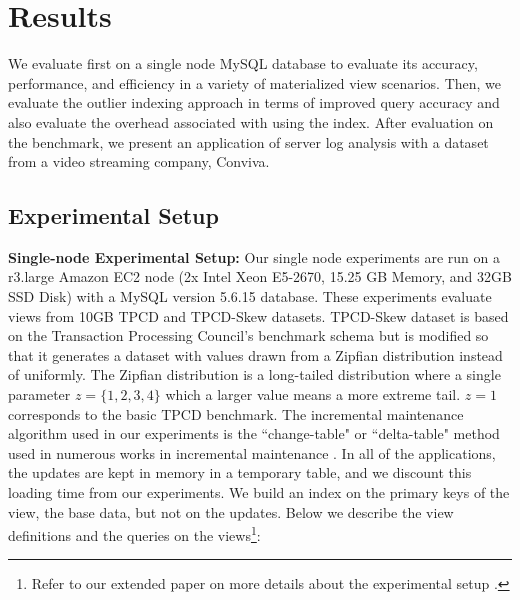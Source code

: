 \section{Results}
\label{exp}
We evaluate \svc first on a single node MySQL database to evaluate its accuracy, performance, and efficiency in a variety of materialized view 
scenarios.
Then, we evaluate the outlier indexing approach in terms of improved query accuracy and also evaluate the overhead associated with using the index.
After evaluation on the benchmark, we present an application of server log analysis with a dataset from a video streaming company, Conviva.

\subsection{Experimental Setup} %
\noindent\textbf{Single-node Experimental Setup: }
Our single node experiments are run on a r3.large Amazon EC2 node (2x Intel Xeon E5-2670, 15.25 GB Memory, and 32GB SSD Disk) with a MySQL version 5.6.15 database.
These experiments evaluate views from 10GB TPCD and TPCD-Skew datasets.
TPCD-Skew dataset \cite{tpcdskew} is based on the Transaction Processing Council's benchmark
schema but is modified so that it generates a dataset with values drawn from a Zipfian distribution instead of uniformly.
The Zipfian distribution \cite{mitzenmacher2004brief} is a long-tailed distribution where a single parameter $z=\{1,2,3,4\}$ which a larger
value means a more extreme tail.
$z=1$ corresponds to the basic TPCD benchmark. 
The incremental maintenance algorithm used in our experiments is the ``change-table" or ``delta-table" method used in numerous works in incremental maintenance \cite{gupta1995maintenance,gupta2006incremental, DBLP:journals/vldb/KochAKNNLS14}.
In all of the applications, the updates are kept in memory in a temporary table, and we discount this loading time from our experiments.
We build an index on the primary keys of the view, the base data, but not on the updates.
Below we describe the view definitions and the queries on the views\footnote{Refer to our extended paper on more details about the experimental setup \cite{technicalReport}.}:

